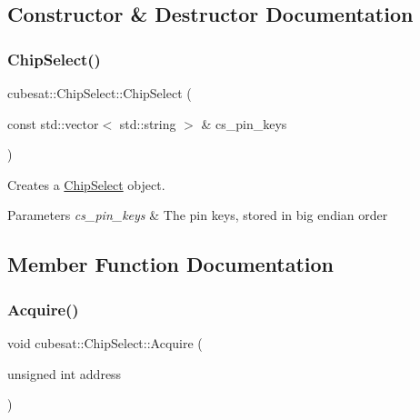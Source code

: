 \subsection{Constructor \& Destructor Documentation}
\mbox{\label{classcubesat_1_1ChipSelect_a18fb93813dc66313c0ebdea468f61366}} 
\subsubsection{\texorpdfstring{Chip\+Select()}{ChipSelect()}}
{\footnotesize\ttfamily cubesat\+::\+Chip\+Select\+::\+Chip\+Select (\begin{DoxyParamCaption}\item[{const std\+::vector$<$ std\+::string $>$ \&}]{cs\+\_\+pin\+\_\+keys }\end{DoxyParamCaption})\hspace{0.3cm}{\ttfamily [inline]}}



Creates a \hyperlink{classcubesat_1_1ChipSelect}{Chip\+Select} object. 


\begin{DoxyParams}{Parameters}
{\em cs\+\_\+pin\+\_\+keys} & The pin keys, stored in big endian order \\
\hline
\end{DoxyParams}


\subsection{Member Function Documentation}
\mbox{\label{classcubesat_1_1ChipSelect_ab173c06bea583f833b11bae2a305701d}} 
\subsubsection{\texorpdfstring{Acquire()}{Acquire()}}
{\footnotesize\ttfamily void cubesat\+::\+Chip\+Select\+::\+Acquire (\begin{DoxyParamCaption}\item[{unsigned int}]{address }\end{DoxyParamCaption})\hspace{0.3cm}{\ttfamily [inline]}}



